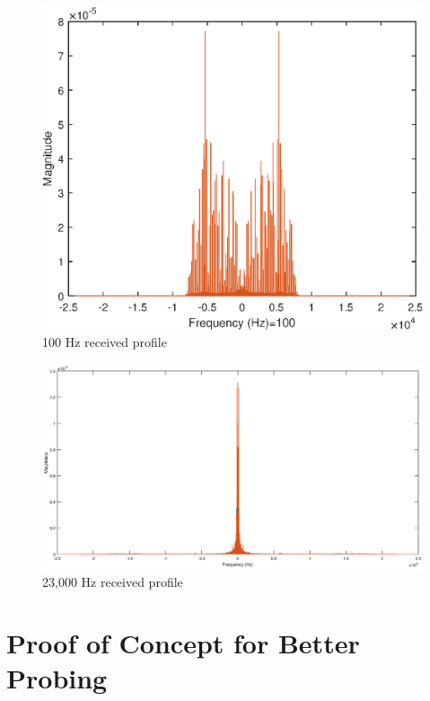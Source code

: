 \documentclass{report}
\begin{document}
\begin{figure}[H]
    \centering
    \includegraphics[width=0.7\linewidth]{small_anamoly.eps}
    \caption{100 Hz received profile}
    \label{fig:enter-label}
\end{figure}


\begin{figure}[H]
    \centering
    \includegraphics[width=1\linewidth]{23k.eps}
    \caption{23,000 Hz received profile}
    \label{fig:enter-label}
\end{figure}

\newpage


\section{Proof of Concept for Better Probing}
\end{document}
